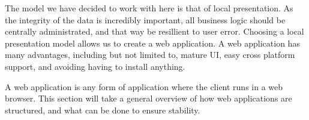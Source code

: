 The model we have decided to work with here is that of local presentation.
As the integrity of the data is incredibly important, all business logic should be centrally administrated, and that way be resillient to user error.
Choosing a local presentation model allows us to create a web application.
A web application has many advantages, including but not limited to, mature UI, easy cross platform support, and avoiding having to install anything.

A web application is any form of application where the client runs in a web browser.
This section will take a general overview of how web applications are structured, and what can be done to ensure stability.
